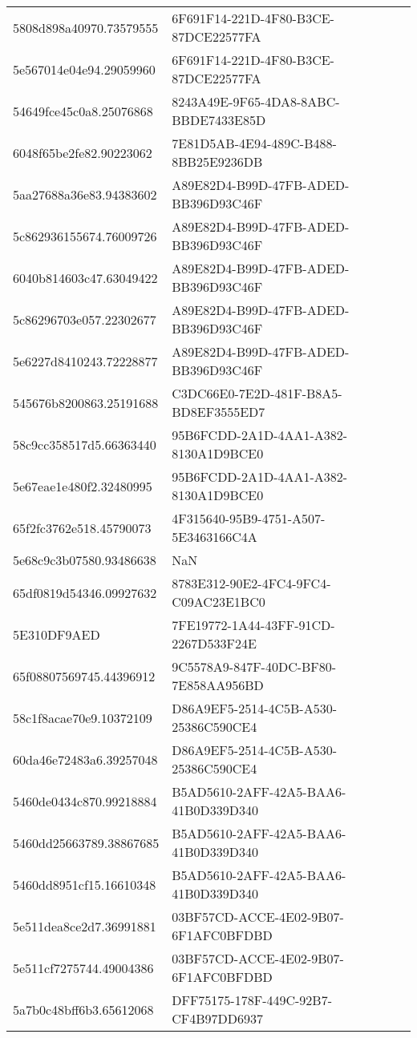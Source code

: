 \begin{tabular}{ll}
5808d898a40970.73579555 & 6F691F14-221D-4F80-B3CE-87DCE22577FA \\
5e567014e04e94.29059960 & 6F691F14-221D-4F80-B3CE-87DCE22577FA \\
54649fce45c0a8.25076868 & 8243A49E-9F65-4DA8-8ABC-BBDE7433E85D \\
6048f65be2fe82.90223062 & 7E81D5AB-4E94-489C-B488-8BB25E9236DB \\
5aa27688a36e83.94383602 & A89E82D4-B99D-47FB-ADED-BB396D93C46F \\
5c862936155674.76009726 & A89E82D4-B99D-47FB-ADED-BB396D93C46F \\
6040b814603c47.63049422 & A89E82D4-B99D-47FB-ADED-BB396D93C46F \\
5c86296703e057.22302677 & A89E82D4-B99D-47FB-ADED-BB396D93C46F \\
5e6227d8410243.72228877 & A89E82D4-B99D-47FB-ADED-BB396D93C46F \\
545676b8200863.25191688 & C3DC66E0-7E2D-481F-B8A5-BD8EF3555ED7 \\
58c9cc358517d5.66363440 & 95B6FCDD-2A1D-4AA1-A382-8130A1D9BCE0 \\
5e67eae1e480f2.32480995 & 95B6FCDD-2A1D-4AA1-A382-8130A1D9BCE0 \\
65f2fc3762e518.45790073 & 4F315640-95B9-4751-A507-5E3463166C4A \\
5e68c9c3b07580.93486638 & NaN \\
65df0819d54346.09927632 & 8783E312-90E2-4FC4-9FC4-C09AC23E1BC0 \\
5E310DF9AED & 7FE19772-1A44-43FF-91CD-2267D533F24E \\
65f08807569745.44396912 & 9C5578A9-847F-40DC-BF80-7E858AA956BD \\
58c1f8acae70e9.10372109 & D86A9EF5-2514-4C5B-A530-25386C590CE4 \\
60da46e72483a6.39257048 & D86A9EF5-2514-4C5B-A530-25386C590CE4 \\
5460de0434c870.99218884 & B5AD5610-2AFF-42A5-BAA6-41B0D339D340 \\
5460dd25663789.38867685 & B5AD5610-2AFF-42A5-BAA6-41B0D339D340 \\
5460dd8951cf15.16610348 & B5AD5610-2AFF-42A5-BAA6-41B0D339D340 \\
5e511dea8ce2d7.36991881 & 03BF57CD-ACCE-4E02-9B07-6F1AFC0BFDBD \\
5e511cf7275744.49004386 & 03BF57CD-ACCE-4E02-9B07-6F1AFC0BFDBD \\
5a7b0c48bff6b3.65612068 & DFF75175-178F-449C-92B7-CF4B97DD6937 \\

\end{tabular}
